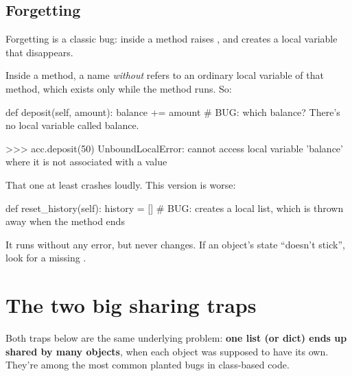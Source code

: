 \documentclass[10pt,a4paper]{article}
\begin{document}
\subsection{Forgetting }
\begin{trapbox}
Forgetting  is a classic bug:  inside a method raises , and  creates a local variable that disappears.
\end{trapbox}
Inside a method, a name \emph{without}  refers to an ordinary local variable of that method, which exists only while the method runs. So:
\begin{pycode}
    def deposit(self, amount):
        balance += amount            # BUG: which balance? There's no local variable called balance.
\end{pycode}
\begin{txtcode}
>>> acc.deposit(50)
UnboundLocalError: cannot access local variable 'balance' where it is not associated with a value
\end{txtcode}
That one at least crashes loudly. This version is worse:
\begin{pycode}
    def reset_history(self):
        history = []                 # BUG: creates a local list, which is thrown away when the method ends
\end{pycode}
It runs without any error, but  never changes. If an object’s state “doesn’t stick”, look for a missing .
\setcounter{section}{1}
\section{The two big sharing traps}
Both traps below are the same underlying problem: \textbf{one list (or dict) ends up shared by many objects}, when each object was supposed to have its own. They’re among the most common planted bugs in class-based code.
\end{document}
